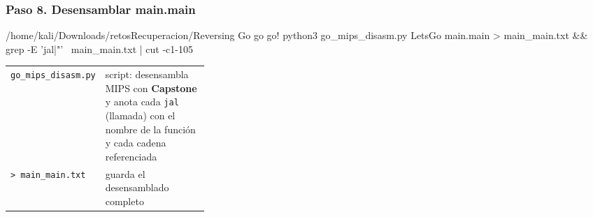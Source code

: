 \documentclass[11pt,a4paper]{article}
\begin{document}
\subsubsection*{Paso 8. Desensamblar main.main}
\begin{comando}{/home/kali/Downloads/retosRecuperacion/Reversing Go go go!}
python3 go_mips_disasm.py LetsGo main.main > main_main.txt && grep -E 'jal|"' \
  main_main.txt | cut -c1-105
\end{comando}
\begin{tcolorbox}[enhanced, breakable, colback=white, colframe=gray!40, boxrule=0.3pt, arc=1pt, left=4pt, right=4pt, top=2pt, bottom=2pt, fonttitle=\sffamily\scriptsize\bfseries, coltitle=black!75, colbacktitle=gray!8, title={Qué hace cada parte}, attach title to upper, before skip=2pt, after skip=4pt, fontupper=\small]
\par{\renewcommand{\arraystretch}{1.12}\begin{tabularx}{\linewidth}{@{}>{\raggedright\arraybackslash}p{0.33\linewidth}>{\raggedright\arraybackslash}X@{}}
\texttt{go\_\allowbreak{}mips\_\allowbreak{}disasm.py} & script: desensambla MIPS con \textbf{Capstone} y anota cada \texttt{jal} (llamada) con el nombre de la función y cada cadena referenciada \\
\texttt{> main\_\allowbreak{}main.txt} & guarda el desensamblado completo \\
\end{tabularx}}
\end{tcolorbox}
\end{document}
